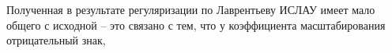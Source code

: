Полученная в результате регуляризации по Лаврентьеву ИСЛАУ имеет мало общего с исходной -- это связано с тем, что у коэффициента масштабирования отрицательный знак,